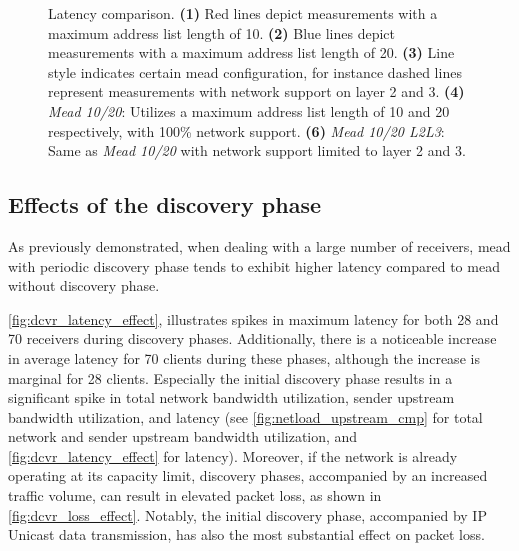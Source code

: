 \begin{figure}
    \begin{center}
        
    \end{center}
    \caption[UC1 Live stream: Latency comparison]{
        \nuci{} Latency comparison.
        \textbf{(1)} Red lines depict measurements with a maximum address list length of 10.
        \textbf{(2)} Blue lines depict measurements with a maximum address list length of 20.
        \textbf{(3)} Line style indicates certain \gls{mead} configuration, for
            instance dashed lines represent measurements with network support
            on layer 2 and 3.
        \textbf{(4)} \textit{Mead 10/20}:
            Utilizes a maximum address list length of 10 and 20 respectively,
            with 100\% network support.
        \textbf{(6)} \textit{Mead 10/20 L2L3}:
            Same as \textit{Mead 10/20} with network support limited to layer 2 and 3.
    }
    \label{fig:latency_cmp}
\end{figure}



\subsection{Effects of the discovery phase} %
\label{sub:Results_Effects of the Discovery phase}

As previously demonstrated, when dealing with a large number of receivers,
    \gls{mead} with periodic discovery phase tends to exhibit higher latency
    compared to \gls{mead} without discovery phase.

\autoref{fig:dcvr_latency_effect}, illustrates spikes in maximum latency for
    both 28 and 70 receivers during discovery phases.
Additionally, there is a noticeable increase in average latency for 70 clients
    during these phases, although the increase is marginal for 28 clients.
Especially the initial discovery phase results in a significant spike in
    total network bandwidth utilization, sender upstream bandwidth utilization,
    and latency (see \autoref{fig:netload_upstream_cmp} for total network and
    sender upstream bandwidth utilization, and
    \autoref{fig:dcvr_latency_effect} for latency).
Moreover, if the network is already operating at its capacity limit, discovery
    phases, accompanied by an increased traffic volume, can result in elevated
    packet loss, as shown in \autoref{fig:dcvr_loss_effect}.
Notably, the initial discovery phase, accompanied by IP Unicast data
    transmission, has also the most substantial effect on packet loss.

